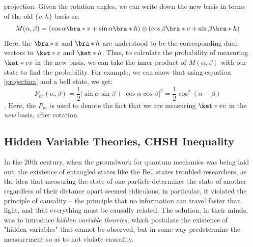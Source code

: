 \documentclass[10pt]{article}
\begin{document}
	projection. Given the rotation angles, we can write down the new basis in terms of the old \( \{v, h\} \)
	basis as:
	\begin{equation}
		\label{projection}
		M(\alpha, \beta) = \left( \cos \alpha \bra*{v} + \sin \alpha \bra*{h} \right) \otimes \left( \cos \beta
		\bra*{v} + \sin \beta \bra*{h} \right)
	\end{equation}
	Here, the \( \bra*{v} \) and \( \bra*{h} \) are understood to be the corresponding dual vectors to 
	\( \ket*{v} \) and \( \ket*{h} \). Thus, to calculate the probability of measuring \( \ket*{vv} \) in the
	new basis, we can take the inner product of \( M(\alpha, \beta) \) with our state to find the
	probability. For example, we can show that using equation \ref{projection} and a bell state, we
	get:
	\[
		P_{vv}(\alpha, \beta) = \frac{1}{2}|\sin \alpha \sin \beta + \cos \alpha \cos \beta|^2 =
		\frac{1}{2}\cos^2(\alpha - \beta)
	\]
	\cite{dehlinger}. Here, the \( P_{vv} \) is used to denote the fact that we are measuring \( \ket*{vv} \) in the
	\textit{new} basis, after rotation.  
	\subsection{Hidden Variable Theories, CHSH Inequality}
	In the 20th century, when the groundwork for quantum mechanics was being laid out, the existence of
	entangled states like the Bell states troubled researchers, as the idea that measuring the state of one
	particle determines the state of another regardless of their distance apart seemed ridiculous; in
	particular, it violated the principle of causality -- the principle that no information can travel faster
	than light, and that everything must be causally related. The solution, in their minds, was to introduce
	\textit{hidden variable theories}, which postulate the existence of "hidden variables" that cannot be
	observed, but in some way predetermine the measurement so as to not violate causality. 
\end{document}
